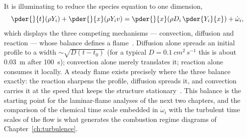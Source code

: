 It is illuminating to reduce the species equation to one dimension,
\begin{equation}
\pder{}{t}(\rho Y_i)+\pder{}{x}(\rho Y_i v)=\pder{}{x}\!\left(\rho D_i\,\pder{Y_i}{x}\right)+\dot\omega_i ,
\label{eq:cdr-1d}
\end{equation}
which displays the three competing mechanisms --- convection, diffusion and reaction --- whose balance defines a flame~\cite{lecture8}. Diffusion alone spreads an initial profile to a width $\sim\sqrt{D(t-t_0)}$ (for a typical $D=\SI{0.1}{cm^2\,s^{-1}}$ this is about \SI{0.03}{m} after \SI{100}{s}); convection alone merely translates it; reaction alone consumes it locally. A steady flame exists precisely where the three balance exactly: the reaction sharpens the profile, diffusion spreads it, and convection carries it at the speed that keeps the structure stationary~\cite{lecture8}. This balance is the starting point for the laminar-flame analyses of the next two chapters, and the comparison of the chemical time scale embedded in $\dot\omega_i$ with the turbulent time scales of the flow is what generates the combustion regime diagrams of Chapter~\ref{ch:turbulence}.
